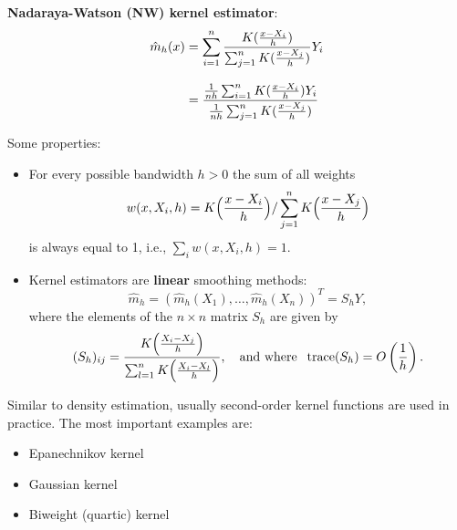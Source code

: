 \documentclass[14pt]{extreport}\usepackage[]{graphicx}\usepackage[]{xcolor}
\begin{document}
\bigbreak
 
\par\noindent
{\bf Nadaraya-Watson (NW) kernel estimator}:
\begin{align*}
{\hat m}_ h(x)&=\sum_{i=1}^n {K({x-X_i\over h})\over
\sum_{j=1}^n K({x-X_j\over h})}Y_i\\[2ex]
&=\frac{\frac{1}{nh} \sum_{i=1}^n K({x-X_i\over h})Y_i}{
\frac{1}{nh} \sum_{j=1}^n K({x-X_j\over h})}
\end{align*}
 
Some properties:
\begin{itemize}
\item For every possible bandwidth $h>0$ the sum of all weights
$$
w(x,X_i, h)=K\Big({x-X_i\over h}\Big)/\sum_{j=1}^n
K\Big({x-X_j\over h}\Big)
$$
is always equal to 1, i.e., $\sum_i w(x,X_i, h)=1$.

\item Kernel estimators are \textbf{linear} smoothing methods:
$$
\hat m_h=(\hat m_h(X_1),\dots,\hat m_h(X_n))^T=S_h Y,
$$
where the elements of the $n\times n$ matrix
$S_ h$ are given by
$$
(S_ h)_{ij}={ K\Big({X_i-X_j\over  h}\Big)\over
\sum_{l=1}^n K\Big({X_i-X_l\over h}\Big)},\quad\text{and where }\;\operatorname{trace}(S_h)=O\left(\frac{1}{h}\right).
$$
\end{itemize}

\bigskip

Similar to density estimation, usually second-order kernel functions are used in practice.
The most important examples are:
\begin{itemize}
\item Epanechnikov kernel
\item Gaussian kernel
\item Biweight (quartic) kernel
\end{itemize}

\bigskip
\end{document}
